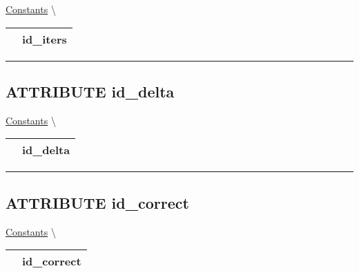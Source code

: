 \hypertarget{ecldoc:logisticregression.constants.id_iters}{}
\hspace{0pt} \hyperlink{ecldoc:LogisticRegression.Constants}{Constants} \textbackslash 

{\renewcommand{\arraystretch}{1.5}
\begin{tabularx}{\textwidth}{|>{\raggedright\arraybackslash}l|X|}
\hline
\hspace{0pt}\mytexttt{\color{red} } & \textbf{id\_iters} \\
\hline
\end{tabularx}
}

\par


\rule{\linewidth}{0.5pt}
\subsection*{\textsf{\colorbox{headtoc}{\color{white} ATTRIBUTE}
id\_delta}}

\hypertarget{ecldoc:logisticregression.constants.id_delta}{}
\hspace{0pt} \hyperlink{ecldoc:LogisticRegression.Constants}{Constants} \textbackslash 

{\renewcommand{\arraystretch}{1.5}
\begin{tabularx}{\textwidth}{|>{\raggedright\arraybackslash}l|X|}
\hline
\hspace{0pt}\mytexttt{\color{red} } & \textbf{id\_delta} \\
\hline
\end{tabularx}
}

\par


\rule{\linewidth}{0.5pt}
\subsection*{\textsf{\colorbox{headtoc}{\color{white} ATTRIBUTE}
id\_correct}}

\hypertarget{ecldoc:logisticregression.constants.id_correct}{}
\hspace{0pt} \hyperlink{ecldoc:LogisticRegression.Constants}{Constants} \textbackslash 

{\renewcommand{\arraystretch}{1.5}
\begin{tabularx}{\textwidth}{|>{\raggedright\arraybackslash}l|X|}
\hline
\hspace{0pt}\mytexttt{\color{red} } & \textbf{id\_correct} \\
\hline
\end{tabularx}
}

